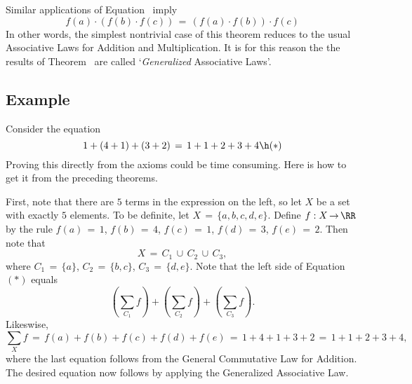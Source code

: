 {        Similar applications of Equation~ imply
        \begin{displaymath}
        f(a){\cdot}(f(b){\cdot}f(c)) \,=\, (f(a){\cdot}f(b)){\cdot}f(c)
        \end{displaymath}
    In other words, the simplest nontrivial case of this theorem reduces to the usual Associative Laws for Addition and Multiplication.
    It is for this reason the the results of Theorem~ are called `{\em Generalized} Associative Laws'.

\V
\V

            \subsection{\small{\bf Example}}
            \label{ExampB10.70}

        Consider the equation
        \begin{displaymath}
        1+(4+1)+(3+2) \,=\, 1+1+2+3+4 \h ({\ast})
        \end{displaymath}
    Proving this directly from the axioms could be time consuming. Here is how to get it from the preceding theorems.

        First, note that there are $5$ terms in the expression on the left, so let $X$ be a set with exactly $5$ elements.
    To be definite, let $X \,=\, \{a,b,c,d,e\}$. Define $f:X \,{\rightarrow}\, {\RR}$ by the rule $f(a) \,=\, 1$, $f(b) \,=\, 4$, $f(c) \,=\, 1$, $f(d) \,=\, 3$, $f(e) \,=\, 2$.
    Then note that
        \begin{displaymath}
        X \,=\, C_{1}\,{\cup}\,C_{2}\,{\cup}\,C_{3},
        \end{displaymath}
    where $C_{1} \,=\, \{a\}$, $C_{2} \,=\, \{b,c\}$, $C_{3} \,=\, \{d,e\}$.
    Note that the left side of Equation~$({\ast})$ equals
        \begin{displaymath}
        ({\sum}_{C_{1}} f)+ ({\sum}_{C_{2}} f) + ({\sum}_{C_{3}} f).
        \end{displaymath}
    Likeswise,
        \begin{displaymath}
        {\sum}_{X} f \,=\, f(a) + f(b) + f(c) + f(d) + f(e) \,=\, 1+4+1+3+2 \,=\, 1+1+2+3+4,
        \end{displaymath}
    where the last equation follows from the General Commutative Law for Addition.
    The desired equation now follows by applying the Generalized Associative Law.


\V
\V

}
